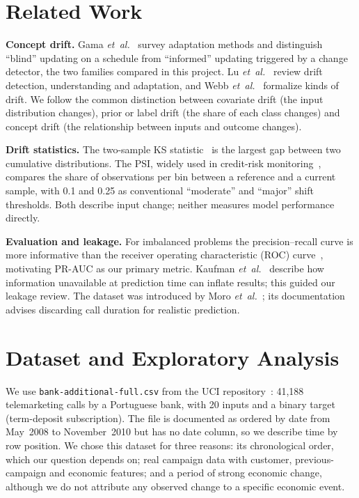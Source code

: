 \documentclass[conference]{IEEEtran}
\begin{document}
\section{Related Work}

\textbf{Concept drift.} Gama \emph{et~al.}~\cite{gama2014survey} survey adaptation methods and distinguish ``blind'' updating on a schedule from ``informed'' updating triggered by a change detector, the two families compared in this project. Lu \emph{et~al.}~\cite{lu2019review} review drift detection, understanding and adaptation, and Webb \emph{et~al.}~\cite{webb2016characterizing} formalize kinds of drift. We follow the common distinction between covariate drift (the input distribution changes), prior or label drift (the share of each class changes) and concept drift (the relationship between inputs and outcome changes).

\textbf{Drift statistics.} The two-sample KS statistic~\cite{massey1951ks} is the largest gap between two cumulative distributions. The PSI, widely used in credit-risk monitoring~\cite{siddiqi2006credit}, compares the share of observations per bin between a reference and a current sample, with 0.1 and 0.25 as conventional ``moderate'' and ``major'' shift thresholds. Both describe input change; neither measures model performance directly.

\textbf{Evaluation and leakage.} For imbalanced problems the precision--recall curve is more informative than the receiver operating characteristic (ROC) curve~\cite{saito2015pr}, motivating PR-AUC as our primary metric. Kaufman \emph{et~al.}~\cite{kaufman2012leakage} describe how information unavailable at prediction time can inflate results; this guided our leakage review. The dataset was introduced by Moro \emph{et~al.}~\cite{moro2014data}; its documentation~\cite{uci2014bank} advises discarding call duration for realistic prediction.

\section{Dataset and Exploratory Analysis}
\label{sec:data}

We use \texttt{bank-additional-full.csv} from the UCI repository~\cite{uci2014bank,moro2014data}: 41,188 telemarketing calls by a Portuguese bank, with 20 inputs and a binary target (term-deposit subscription). The file is documented as ordered by date from May~2008 to November~2010 but has no date column, so we describe time by row position. We chose this dataset for three reasons: its chronological order, which our question depends on; real campaign data with customer, previous-campaign and economic features; and a period of strong economic change, although we do not attribute any observed change to a specific economic event.
\end{document}
